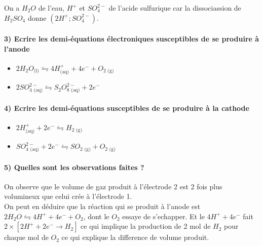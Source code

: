 \documentclass[a4paper, 12pt]{scrartcl}
\begin{document}
On a $H_2O$ de l'eau, $H^+$ et $SO_4^{2-}$ de l'acide sulfurique car la dissociassion de $H_2SO_4$ donne $(2H^+; SO_4^{2-})$.

\paragraph*{3) Ecrire les demi-équations électroniques susceptibles de se produire à l'anode \\[5mm]}

\begin{itemize}
    \item[\textbullet] $2H_2O_{\text{(l)}} \leftrightharpoons 4H^+_{\text{(aq)}} + 4e^- + O_{2\text{ (g)}}$ \\[2mm]
    \item[\textbullet] $2SO_{4\text{ (aq)}}^{2-} \leftrightharpoons S_2O^{2-}_{8\text{ (aq)}}+2e^-$ \\[2mm]
\end{itemize}

\paragraph*{4) Ecrire les demi-équations susceptibles de se produire à la cathode \\[5mm]}

\begin{itemize}
    \item[\textbullet] $2H^+_{\text{(aq)}} + 2e^- \leftrightharpoons H_{2\text{ (g)}}$ \\[2mm]
    \item[\textbullet] $SO^{2-}_{4\text{ (aq)}} + 2e^-\leftrightharpoons SO_{2\text{ (g)}} + O_{2\text{ (g)}}$ \\[2mm]
\end{itemize}

\paragraph*{5) Quelles sont les observations faites ? \\[5mm]}

On observe que le volume de gaz produit à l'électrode 2 est 2 fois plus volumineux que celui crée à l'électrode 1. \\
On peut en déduire que la réaction qui se produit à l'anode est $2H_2O \leftrightharpoons 4H^+ + 4e^- + O_2$, dont le $O_2$ essaye de s'echapper. 
Et le $4H^+ + 4e^-$ fait $2\times \left[ 2H^+ +2e^- \longrightarrow H_2 \right]$ ce qui implique la production de 2 mol de $H_2$ pour chaque mol de $O_2$ 
ce qui explique la difference de volume produit. 
\end{document}
